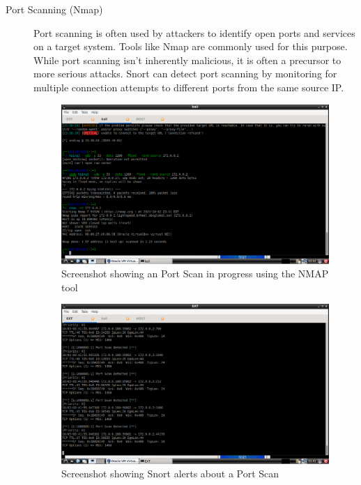 \documentclass[12pt,a4paper]{report}
\begin{document}
\begin{description}
	\item[Port Scanning (Nmap)] Port scanning is often used by attackers to identify open ports and services on a target system. Tools like Nmap are commonly used for this purpose. While port scanning isn't inherently malicious, it is often a precursor to more serious attacks. Snort can detect port scanning by monitoring for multiple connection attempts to different ports from the same source IP.
	
\begin{figure}[H]
    \centering
    \includegraphics[width=\textwidth]{port scan attk.png} 
    \caption{Screenshot showing an Port Scan in progress using the NMAP tool}
    \label{fig:mesh1}
\end{figure}

\begin{figure}[H]
    \centering
    \includegraphics[width=\textwidth]{port scan logs.png} 
    \caption{Screenshot showing Snort alerts about a Port Scan}
    \label{fig:mesh1}
\end{figure}

\end{description}
\end{document}
